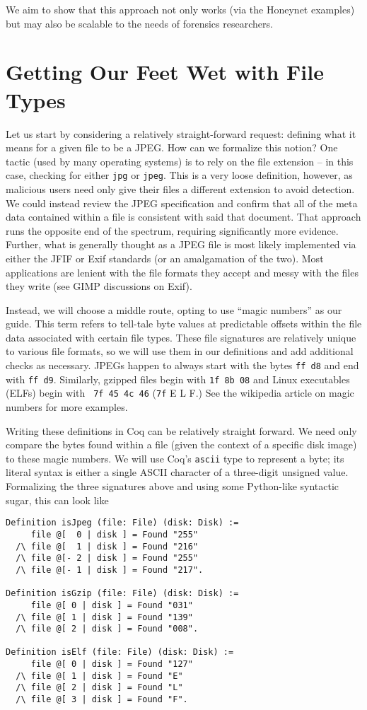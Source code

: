 \documentclass[nocopyrightspace,preprint]{sigplanconf}
\begin{document}
We aim to show that this approach not only works (via the Honeynet examples)
but may also be scalable to the needs of forensics researchers.

\section{Getting Our Feet Wet with File Types}

Let us start by considering a relatively straight-forward request: defining
what it means for a given file to be a JPEG. How can we formalize this notion?
One tactic (used by many operating systems) is to rely on the file extension
-- in this case, checking for either {\tt jpg} or {\tt jpeg}. This is a very
loose definition, however, as malicious users need only give their files a
different extension to avoid detection. We could instead review the JPEG
specification and confirm that all of the meta data contained within a file is
consistent with said that document. That approach runs the opposite end of the
spectrum, requiring significantly more evidence. Further, what is generally
thought as a JPEG file is most likely implemented via either the  JFIF or Exif
standards (or an amalgamation of the two)\cite{jpeg}. Most applications are
lenient with the file formats they accept and messy with the files they
write (see GIMP discussions on Exif\cite{gimp}).

Instead, we will choose a middle route, opting to use ``magic numbers'' as our
guide. This term refers to tell-tale byte values at predictable offsets within
the file data associated with certain file types. These file signatures are
relatively unique to various file formats, so we will use them in our
definitions and add additional checks as necessary. JPEGs happen to always
start with the bytes {\tt ff d8} and end with {\tt ff d9}. Similarly, gzipped
files begin with {\tt 1f 8b 08} and Linux executables (ELFs) begin with {\tt
7f 45 4c 46} ({\tt 7f} E L F.) See the wikipedia article\cite{wiki-magic} on
magic numbers for more examples.

Writing these definitions in Coq can be relatively straight forward. We need
only compare the bytes found within a file (given the context of a specific
disk image) to these magic numbers. We will use Coq's {\tt ascii} type to
represent a byte; its literal syntax is either a single ASCII character of a
three-digit unsigned value. Formalizing the three signatures above and using
some Python-like syntactic sugar, this can look like

\begin{lstlisting}
Definition isJpeg (file: File) (disk: Disk) :=
     file @[  0 | disk ] = Found "255"
  /\ file @[  1 | disk ] = Found "216"
  /\ file @[- 2 | disk ] = Found "255"
  /\ file @[- 1 | disk ] = Found "217".

Definition isGzip (file: File) (disk: Disk) :=
     file @[ 0 | disk ] = Found "031"
  /\ file @[ 1 | disk ] = Found "139" 
  /\ file @[ 2 | disk ] = Found "008".

Definition isElf (file: File) (disk: Disk) :=
     file @[ 0 | disk ] = Found "127"
  /\ file @[ 1 | disk ] = Found "E"
  /\ file @[ 2 | disk ] = Found "L"
  /\ file @[ 3 | disk ] = Found "F".
\end{lstlisting}
\end{document}
